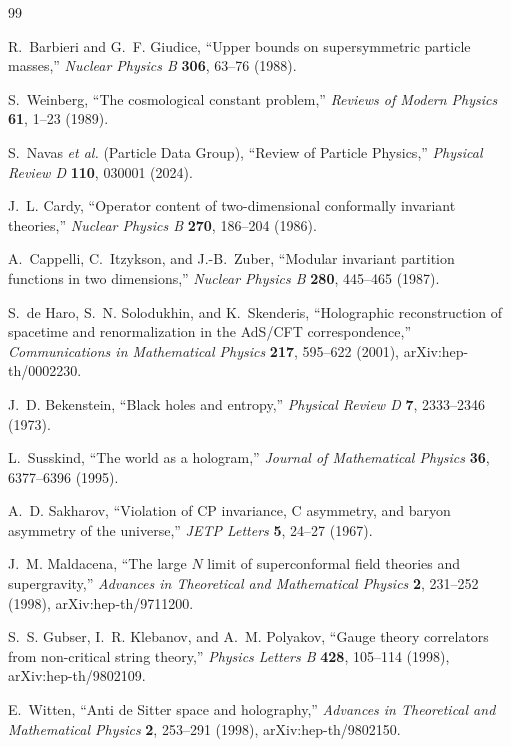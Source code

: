 \documentclass[11pt,letterpaper]{article}
\theoremstyle{plain}
\begin{document}
\begin{thebibliography}{99}

R.~Barbieri and G.~F. Giudice,
``Upper bounds on supersymmetric particle masses,''
\textit{Nuclear Physics B} \textbf{306}, 63--76 (1988).

S.~Weinberg,
``The cosmological constant problem,''
\textit{Reviews of Modern Physics} \textbf{61}, 1--23 (1989).

S.~Navas \textit{et al.} (Particle Data Group),
``Review of Particle Physics,''
\textit{Physical Review D} \textbf{110}, 030001 (2024).

J.~L. Cardy,
``Operator content of two-dimensional conformally invariant theories,''
\textit{Nuclear Physics B} \textbf{270}, 186--204 (1986).

A.~Cappelli, C.~Itzykson, and J.-B.~Zuber,
``Modular invariant partition functions in two dimensions,''
\textit{Nuclear Physics B} \textbf{280}, 445--465 (1987).

S.~de Haro, S.~N. Solodukhin, and K.~Skenderis,
``Holographic reconstruction of spacetime and renormalization in the AdS/CFT
correspondence,''
\textit{Communications in Mathematical Physics} \textbf{217}, 595--622 (2001),
arXiv:hep-th/0002230.

J.~D. Bekenstein,
``Black holes and entropy,''
\textit{Physical Review D} \textbf{7}, 2333--2346 (1973).

L.~Susskind,
``The world as a hologram,''
\textit{Journal of Mathematical Physics} \textbf{36}, 6377--6396 (1995).

A.~D. Sakharov,
``Violation of CP invariance, C asymmetry, and baryon asymmetry of the
universe,''
\textit{JETP Letters} \textbf{5}, 24--27 (1967).

J.~M. Maldacena,
``The large $N$ limit of superconformal field theories and supergravity,''
\textit{Advances in Theoretical and Mathematical Physics} \textbf{2},
231--252 (1998), arXiv:hep-th/9711200.

S.~S. Gubser, I.~R. Klebanov, and A.~M. Polyakov,
``Gauge theory correlators from non-critical string theory,''
\textit{Physics Letters B} \textbf{428}, 105--114 (1998),
arXiv:hep-th/9802109.

E.~Witten,
``Anti de Sitter space and holography,''
\textit{Advances in Theoretical and Mathematical Physics} \textbf{2},
253--291 (1998), arXiv:hep-th/9802150.


\end{thebibliography}
\end{document}
